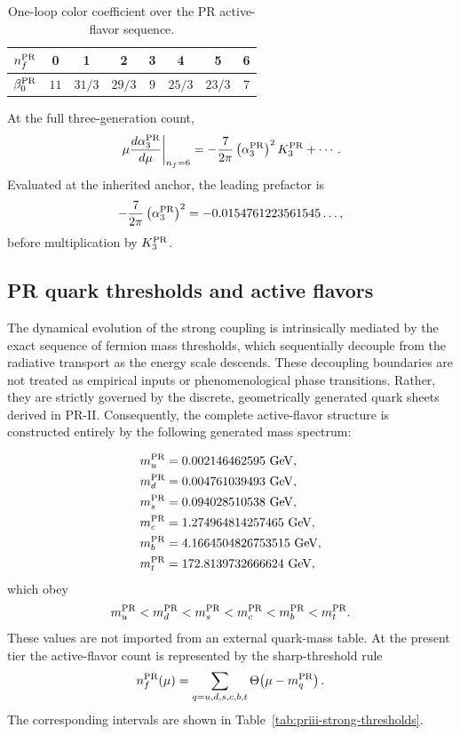 \documentclass[11pt]{article}
\begin{document}
\begin{table}[htbp]
\centering
\caption{One-loop color coefficient over the PR active-flavor sequence.}
\label{tab:priii-strong-beta0}
\begin{tabular}{cccccccc}
\toprule
\(n_f^{\rm PR}\) & 0 & 1 & 2 & 3 & 4 & 5 & 6 \\
\midrule
\(\beta_0^{\rm PR}\)
& \(11\)
& \(31/3\)
& \(29/3\)
& \(9\)
& \(25/3\)
& \(23/3\)
& \(7\) \\
\bottomrule
\end{tabular}
\end{table}

At the full three-generation count,
\begin{equation}
\left.
\mu\frac{d\alpha_3^{\rm PR}}{d\mu}
\right|_{n_f=6}
=
-
\frac{7}{2\pi}
\left(\alpha_3^{\rm PR}\right)^2
K_3^{\rm PR}
+\cdots .
\end{equation}
Evaluated at the inherited anchor, the leading prefactor is
\begin{equation}
-
\frac{7}{2\pi}
\left(\alpha_3^{\rm PR}\right)^2
=
-0.0154761223561545\ldots ,
\end{equation}
before multiplication by \(K_3^{\rm PR}\).

\subsection{PR quark thresholds and active flavors}
\label{subsec:priii-strong-thresholds}
The dynamical evolution of the strong coupling is intrinsically mediated by the exact sequence of fermion mass thresholds, which sequentially decouple from the radiative transport as the energy scale descends. These decoupling boundaries are not treated as empirical inputs or phenomenological phase transitions. Rather, they are strictly governed by the discrete, geometrically generated quark sheets derived in PR-II. Consequently, the complete active-flavor structure is constructed entirely by the following generated mass spectrum:

\begin{align}
m_u^{\rm PR}&=0.002146462595\ {\rm GeV},\\
m_d^{\rm PR}&=0.004761039493\ {\rm GeV},\\
m_s^{\rm PR}&=0.094028510538\ {\rm GeV},\\
m_c^{\rm PR}&=1.274964814257465\ {\rm GeV},\\
m_b^{\rm PR}&=4.1664504826753515\ {\rm GeV},\\
m_t^{\rm PR}&=172.8139732666624\ {\rm GeV},
\end{align}
which obey
\begin{equation}
m_u^{\rm PR}
<
m_d^{\rm PR}
<
m_s^{\rm PR}
<
m_c^{\rm PR}
<
m_b^{\rm PR}
<
m_t^{\rm PR}.
\end{equation}
These values are not imported from an external quark-mass table. At the present tier the active-flavor count is represented by the sharp-threshold rule
\begin{equation}
n_f^{\rm PR}(\mu)
=
\sum_{q=u,d,s,c,b,t}
\Theta\!\left(\mu-m_q^{\rm PR}\right).
\label{eq:priii-active-flavor-count}
\end{equation}
The corresponding intervals are shown in Table~\ref{tab:priii-strong-thresholds}.
\end{document}
